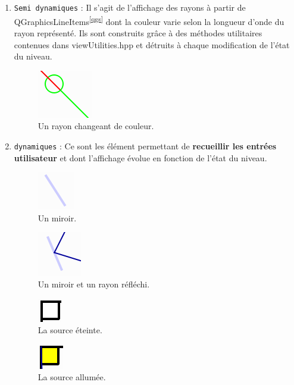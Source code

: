 \documentclass[a4paper,11pt]{report}
\begin{document}
\begin{enumerate}
	\item \texttt{Semi dynamiques} : 
		Il s'agit de l'affichage des rayons à partir de QGraphicsLineItems\textsuperscript{\ref{qgs}} dont la
		couleur varie selon la longueur d'onde du rayon représenté. Ils sont construits
		grâce à des méthodes utilitaires contenues dans viewUtilities.hpp et
		détruits à chaque modification de l'état du niveau. 

		\begin{figure}[h!]
			\caption{Un rayon changeant de couleur.}
			\centering
			\includegraphics{./screenshots/elements_semi_dyn/ray_change_color}
		\end{figure}

	\item \texttt{dynamiques} :
		Ce sont les élément permettant de \textbf{recueillir les entrées
		utilisateur} et dont l'affichage évolue en fonction de l'état du niveau.

		\begin{figure}[h!]
			\caption{Un miroir.}
			\centering
			\includegraphics{./screenshots/elements_dyn/mirror}
		\end{figure}

		\begin{figure}[h!]
			\caption{Un miroir et un rayon réfléchi.}
			\centering
			\includegraphics{./screenshots/elements_dyn/mirror+ray}
		\end{figure}

		\begin{figure}[h!]
			\caption{La source éteinte.}
			\centering
			\includegraphics{./screenshots/elements_dyn/source_off}
		\end{figure}
		\begin{figure}[h!]
			\caption{La source allumée.}
			\centering
			\includegraphics{./screenshots/elements_dyn/source_on}
		\end{figure}
\end{enumerate}
\end{document}
